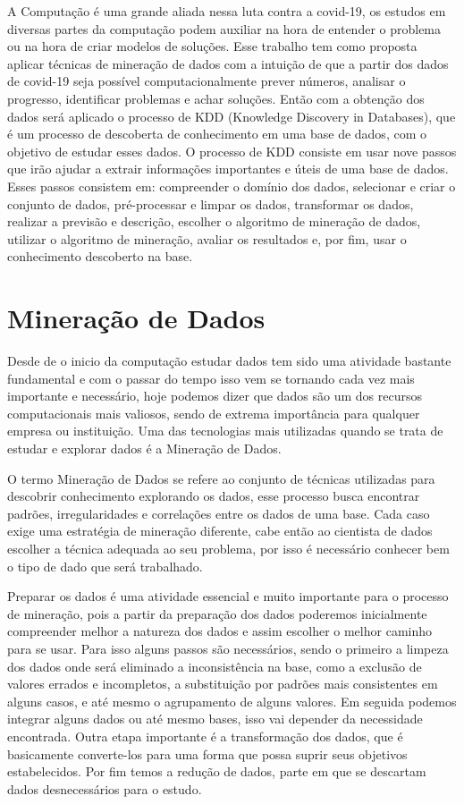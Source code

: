 \documentclass[tcc1]{uftex}
\begin{document}
A Computação é uma grande aliada nessa luta contra a covid-19, os estudos em diversas partes da computação podem auxiliar na hora de entender o problema ou na hora de criar modelos de soluções. Esse trabalho tem como proposta aplicar técnicas de mineração de dados com a intuição de que a partir dos dados de covid-19 seja possível computacionalmente prever números, analisar o progresso, identificar problemas e achar soluções. Então com a obtenção dos dados será aplicado o processo de KDD (Knowledge Discovery in Databases), que é um processo de descoberta de conhecimento em uma base de dados, com o objetivo de estudar esses dados. O processo de KDD consiste em usar nove passos que irão ajudar a extrair informações importantes e úteis de uma base de dados. Esses passos consistem em: compreender o domínio dos dados, selecionar e criar o conjunto de dados, pré-processar e limpar os dados, transformar os dados, realizar a previsão e descrição, escolher o algoritmo de mineração de dados, utilizar o algoritmo de mineração, avaliar os resultados e, por fim, usar o conhecimento descoberto na base.\cite{fayyad1996kdd}

\chapter{Mineração de Dados}

Desde de o inicio da computação estudar dados tem sido uma atividade bastante fundamental e com o passar do tempo isso vem se tornando cada vez mais importante e necessário, hoje podemos dizer que dados são um dos recursos computacionais mais valiosos, sendo de extrema importância para qualquer empresa ou instituição. Uma das tecnologias mais utilizadas quando se trata de estudar e explorar dados é a Mineração de Dados. 

	O termo Mineração de Dados se refere ao conjunto de técnicas utilizadas para descobrir conhecimento explorando os dados, esse processo busca encontrar padrões, irregularidades e correlações entre os dados de uma base. Cada caso exige uma estratégia de mineração diferente, cabe então ao cientista de dados escolher a técnica adequada ao seu problema, por isso é necessário conhecer bem o tipo de dado que será trabalhado. 
	
Preparar os dados é uma atividade essencial e muito importante para o processo de mineração, pois a partir da preparação dos dados poderemos inicialmente compreender melhor a natureza dos dados e assim escolher o melhor caminho para se usar. Para isso alguns passos são necessários, sendo o primeiro a limpeza dos dados onde será eliminado a inconsistência na base, como a exclusão de valores errados e incompletos, a substituição por padrões mais consistentes em alguns casos, e até mesmo o agrupamento de alguns valores. Em seguida podemos integrar alguns dados ou até mesmo bases, isso vai depender da necessidade encontrada. Outra etapa importante é a transformação dos dados, que é basicamente converte-los para uma forma que possa suprir seus objetivos estabelecidos. Por fim temos a redução de dados, parte em que se descartam dados desnecessários para o estudo.\cite{camilo2009mineraccao}
\end{document}
